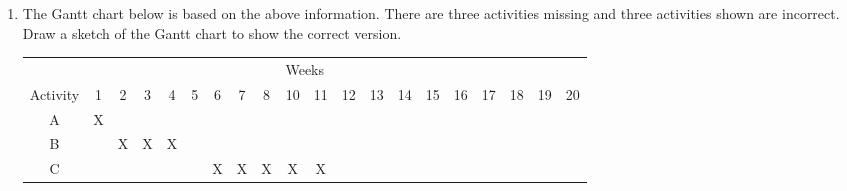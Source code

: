 \begin{enumerate}
\hfill{}{[}4{]}
\begin{enumerate}
\item State the critical path. \hfill{}{[}1{]}
\item State the elapsed time of the project. \hfill{}{[}1{]}
\item State 2 activities not on the critical path, as well as their slack
time. \hfill{}{[}2{]}
\end{enumerate}
\item The Gantt chart below is based on the above information. There are
three activities missing and three activities shown are incorrect.
Draw a sketch of the Gantt chart to show the correct version. 
\noindent \begin{center}
\begin{tabular}{c|c|c|c|c|c|c|c|c|c|c|c|c|c|c|c|c|c|c|c|}
\multicolumn{20}{c}{Weeks}\tabularnewline
\multicolumn{1}{c}{Activity} & \multicolumn{1}{c}{1} & \multicolumn{1}{c}{2} & \multicolumn{1}{c}{3} & \multicolumn{1}{c}{4} & \multicolumn{1}{c}{5} & \multicolumn{1}{c}{6} & \multicolumn{1}{c}{7} & \multicolumn{1}{c}{8} & \multicolumn{1}{c}{10} & \multicolumn{1}{c}{11} & \multicolumn{1}{c}{12} & \multicolumn{1}{c}{13} & \multicolumn{1}{c}{14} & \multicolumn{1}{c}{15} & \multicolumn{1}{c}{16} & \multicolumn{1}{c}{17} & \multicolumn{1}{c}{18} & \multicolumn{1}{c}{19} & \multicolumn{1}{c}{20}\tabularnewline
\cline{2-20} \cline{3-20} \cline{4-20} \cline{5-20} \cline{6-20} \cline{7-20} \cline{8-20} \cline{9-20} \cline{10-20} \cline{11-20} \cline{12-20} \cline{13-20} \cline{14-20} \cline{15-20} \cline{16-20} \cline{17-20} \cline{18-20} \cline{19-20} \cline{20-20} 
A & X &  &  &  &  &  &  &  &  &  &  &  &  &  &  &  &  &  & \tabularnewline
\cline{2-20} \cline{3-20} \cline{4-20} \cline{5-20} \cline{6-20} \cline{7-20} \cline{8-20} \cline{9-20} \cline{10-20} \cline{11-20} \cline{12-20} \cline{13-20} \cline{14-20} \cline{15-20} \cline{16-20} \cline{17-20} \cline{18-20} \cline{19-20} \cline{20-20} 
B &  & X & X & X &  &  &  &  &  &  &  &  &  &  &  &  &  &  & \tabularnewline
\cline{2-20} \cline{3-20} \cline{4-20} \cline{5-20} \cline{6-20} \cline{7-20} \cline{8-20} \cline{9-20} \cline{10-20} \cline{11-20} \cline{12-20} \cline{13-20} \cline{14-20} \cline{15-20} \cline{16-20} \cline{17-20} \cline{18-20} \cline{19-20} \cline{20-20} 
C &  &  &  &  &  & X & X & X & X & X &  &  &  &  &  &  &  &  & \tabularnewline
\cline{2-20} \cline{3-20} \cline{4-20} \cline{5-20} \cline{6-20} \cline{7-20} \cline{8-20} \cline{9-20} \cline{10-20} \cline{11-20} \cline{12-20} \cline{13-20} \cline{14-20} \cline{15-20} \cline{16-20} \cline{17-20} \cline{18-20} \cline{19-20} \cline{20-20} 

\end{tabular}
\end{center}
\end{enumerate}
